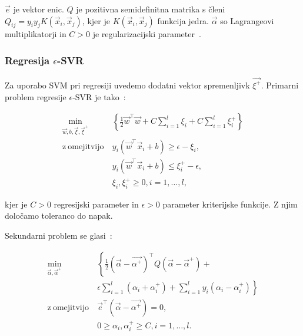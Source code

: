 {$\vec{e}$ je vektor enic. $Q$ je pozitivna semidefinitna matrika s členi $Q_{ij} = y_i y_jK(\vec{x}_i,\vec{x}_j)$, kjer je $K(\vec{x}_i,\vec{x}_j)$ funkcija jedra. $\vec{\alpha}$ so Lagrangeovi multiplikatorji in $C>0$ je regularizacijski parameter~\cite{chang2011a}.








\subsubsection{Regresija \texorpdfstring{$\epsilon$}{e}-SVR}

Za uporabo SVM pri regresiji uvedemo dodatni vektor spremenljivk $\vec{\xi^+}$. Primarni problem regresije $\epsilon$-SVR je  tako~\cite{chang2011a}:

\begin{equation}\label{eq:e-svr-primal}
\begin{aligned}
\min_{\vec{w}, b, \vec{\xi}, \vec{\xi}^+} &~ \left\{ \frac{1}{2} \vec{w}^\top\vec{w} + C \sum_{i=1}^l\xi_i + C \sum_{i=1}^l\xi_i^+ \right\}\\
    \mathrm{z~omejitvijo} &~ y_i \left( \vec{w}^\top \vec{x}_i + b \right) \geq \epsilon - \xi_i,\\
    &~  y_i \left( \vec{w}^\top \vec{x}_i + b \right) \leq \xi_i^+ - \epsilon, \\
    &~  \xi_i,\xi_i^+ \geq 0, i=1, \ldots, l,
\end{aligned}	
\end{equation}

kjer je $C>0$ regresijski parameter in $\epsilon > 0$ parameter kriterijske funkcije. Z njim določamo toleranco do napak.

Sekundarni problem se glasi~\cite{chang2011a}:

\begin{equation}\label{eq:e-svr-dual}
\begin{aligned}
\min_{\vec{\alpha}, \vec{\alpha}^+} &~ \left\{ \frac{1}{2} (\vec{\alpha} - \vec{\alpha^ +})^\top Q (\vec{\alpha} - \vec{\alpha}^+) +\right. \\
&~ \left.\epsilon \sum_{i=1}^l\left( \alpha_i + \alpha_i^+ \right) + \sum_{i=1}^l y_i\left( \alpha_i - \alpha_i^+ \right) \right\}\\
    \mathrm{z~omejitvijo} &~ 
    \vec{e}^\top \left(\vec{\alpha} - \vec{\alpha^+} \right) = 0,\\
    &~ 0 \geq \alpha_i, \alpha_i^+ \geq C, i=1, \ldots, l.
\end{aligned}	
\end{equation}

}
